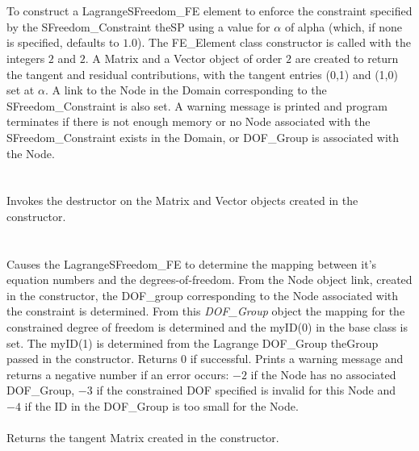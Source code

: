   \\
\\
To construct a LagrangeSFreedom\_FE element to enforce the constraint
specified by the SFreedom\_Constraint \p theSP using a value for
$\alpha$ of \p alpha (which, if none is specified, defaults to
$1.0$). The FE\_Element class constructor is called with 
the integers $2$ and $2$. A Matrix and a Vector object of order $2$
are created to return the tangent and residual contributions, with the
tangent entries (0,1) and (1,0) set at $\alpha$. A link to the Node in the Domain
corresponding to the SFreedom\_Constraint is also set. A warning message is
printed and program terminates if there is not enough memory or no
Node associated with the SFreedom\_Constraint exists in the Domain, or
DOF\_Group is associated with the Node.\\

  \\
  \\
Invokes the destructor on the Matrix and Vector objects created in the
constructor. \\

  \\
 \\
Causes the LagrangeSFreedom\_FE to determine the mapping between it's equation
numbers and the degrees-of-freedom. From the Node object link, created
in the constructor, the DOF\_group corresponding to the Node
associated with the constraint is determined. From this {\em
DOF\_Group} object the mapping for the constrained degree of freedom
is determined and the myID(0) in the base class is set. The myID(1) is
determined from the Lagrange DOF\_Group \p theGroup passed in the
constructor. Returns $0$ if 
successful. Prints a warning message and returns a negative number if
an error occurs: $-2$ if the
Node has no associated DOF\_Group, $-3$ if the constrained DOF
specified is invalid for this Node and $-4$ if the ID in the
DOF\_Group is too small for the Node. \\ 

 \\
Returns the tangent Matrix created in the constructor. \\

